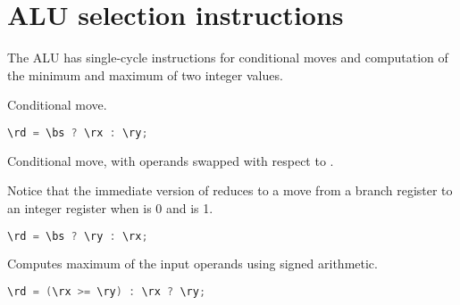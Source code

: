 \section{ALU selection instructions}


The \rvex{} ALU has single-cycle instructions for conditional moves and
computation of the minimum and maximum of two integer values.

Conditional move.

\begin{lstlisting}[numbers=none, basicstyle=\ttfamily\footnotesize, language=C++]
\rd = \bs ? \rx : \ry;
\end{lstlisting}

Conditional move, with operands swapped with respect to .

Notice that the immediate version of  reduces to a move from a
branch register to an integer register when  is 0 and  is 1.

\begin{lstlisting}[numbers=none, basicstyle=\ttfamily\footnotesize, language=C++]
\rd = \bs ? \ry : \rx;
\end{lstlisting}

Computes maximum of the input operands using signed arithmetic.

\begin{lstlisting}[numbers=none, basicstyle=\ttfamily\footnotesize, language=C++]
\rd = (\rx >= \ry) : \rx ? \ry;
\end{lstlisting}


